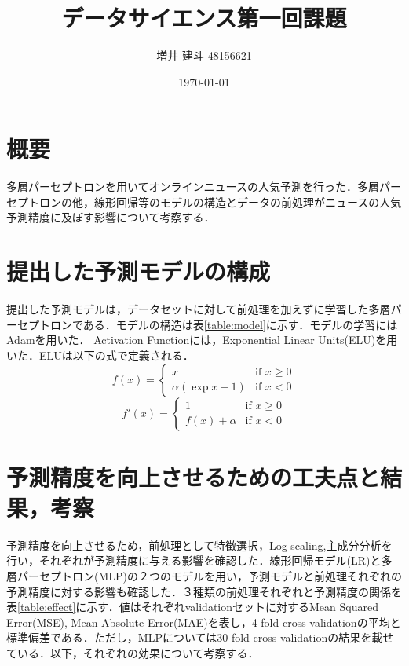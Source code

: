 

\title{データサイエンス第一回課題}
\author{増井 建斗 48156621}
\date{\today}

\maketitle

\section{概要}
多層パーセプトロンを用いてオンラインニュースの人気予測を行った．多層パーセプトロンの他，線形回帰等のモデルの構造とデータの前処理がニュースの人気予測精度に及ぼす影響について考察する．

\section{提出した予測モデルの構成}
提出した予測モデルは，データセットに対して前処理を加えずに学習した多層パーセプトロンである．モデルの構造は表\ref{table:model}に示す．モデルの学習にはAdam\cite{adam}を用いた．
Activation Functionには，Exponential Linear Units(ELU)\cite{elu}を用いた．ELUは以下の式で定義される．
\begin{equation}
f(x) = \begin{cases}
	x & \text{if }x \ge 0\\
	\alpha(\exp{x}-1) & \text{if }x  < 0
	\end{cases}
\end{equation}
\begin{equation}
f'(x) = \begin{cases}
	1 & \text{if }x \ge 0\\
	f(x)+\alpha & \text{if }x  < 0
	\end{cases}
\end{equation}
\section{予測精度を向上させるための工夫点と結果，考察}

予測精度を向上させるため，前処理として特徴選択，Log scaling,主成分分析を行い，それぞれが予測精度に与える影響を確認した．線形回帰モデル(LR)と多層パーセプトロン(MLP)の２つのモデルを用い，予測モデルと前処理それぞれの予測精度に対する影響も確認した．３種類の前処理それぞれと予測精度の関係を表\ref{table:effect}に示す．値はそれぞれvalidationセットに対するMean Squared Error(MSE), Mean Absolute Error(MAE)を表し，4 fold cross validationの平均と標準偏差である．ただし，MLPについては30 fold cross validationの結果を載せている．以下，それぞれの効果について考察する．

